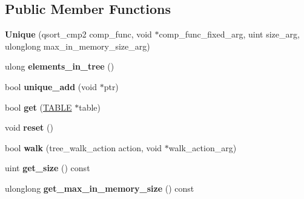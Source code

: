 \subsection*{Public Member Functions}
\begin{DoxyCompactItemize}
\item 
\mbox{\label{classUnique_a61d5c27e4561d69bf2cf43a2b6f5be9a}} 
{\bfseries Unique} (qsort\+\_\+cmp2 comp\+\_\+func, void $\ast$comp\+\_\+func\+\_\+fixed\+\_\+arg, uint size\+\_\+arg, ulonglong max\+\_\+in\+\_\+memory\+\_\+size\+\_\+arg)
\item 
\mbox{\label{classUnique_a078cad68b402f73a2694ecf756fda555}} 
ulong {\bfseries elements\+\_\+in\+\_\+tree} ()
\item 
\mbox{\label{classUnique_a2321f0d50c059178ae4a7f63eac140ad}} 
bool {\bfseries unique\+\_\+add} (void $\ast$ptr)
\item 
\mbox{\label{classUnique_a73446863b4c75d42e65ed4a83e2ee1b0}} 
bool {\bfseries get} (\mbox{\hyperlink{structTABLE}{T\+A\+B\+LE}} $\ast$table)
\item 
\mbox{\label{classUnique_ab5ebe0252fd71674a200fb8591a04481}} 
void {\bfseries reset} ()
\item 
\mbox{\label{classUnique_aab26338179087536e44df019fa6dbc3b}} 
bool {\bfseries walk} (tree\+\_\+walk\+\_\+action action, void $\ast$walk\+\_\+action\+\_\+arg)
\item 
\mbox{\label{classUnique_a049f29e8aa73fa6facb64cfc3636dbf7}} 
uint {\bfseries get\+\_\+size} () const
\item 
\mbox{\label{classUnique_ae27e1963c6ecf8a1d24c54cd4361d1dc}} 
ulonglong {\bfseries get\+\_\+max\+\_\+in\+\_\+memory\+\_\+size} () const
\end{DoxyCompactItemize}
